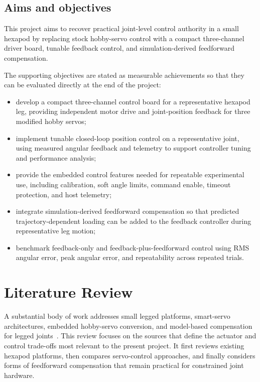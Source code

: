 \subsection{Aims and objectives}
This project aims to recover practical joint-level control authority in a small hexapod by replacing stock hobby-servo control with a compact three-channel driver board, tunable feedback control, and simulation-derived feedforward compensation.

The supporting objectives are stated as measurable achievements so that they can be evaluated directly at the end of the project:
\begin{itemize}[leftmargin=*]
  \item develop a compact three-channel control board for a representative hexapod leg, providing independent motor drive and joint-position feedback for three modified hobby servos;
  \item implement tunable closed-loop position control on a representative joint, using measured angular feedback and telemetry to support controller tuning and performance analysis;
  \item provide the embedded control features needed for repeatable experimental use, including calibration, soft angle limits, command enable, timeout protection, and host telemetry;
  \item integrate simulation-derived feedforward compensation so that predicted trajectory-dependent loading can be added to the feedback controller during representative leg motion;
  \item benchmark feedback-only and feedback-plus-feedforward control using RMS angular error, peak angular error, and repeatability across repeated trials.
\end{itemize}

\section{Literature Review}

A substantial body of work addresses small legged platforms, smart-servo architectures, embedded hobby-servo conversion, and model-based compensation for legged joints~\cite{saranli2001rhex,barragan2018minirhex,interbotixphantomx,steindl2020bruce,openservo2018,dtuinspectionrobot,backstrom2020servoarm,lynch2017modernrobotics}. This review focuses on the sources that define the actuator and control trade-offs most relevant to the present project. It first reviews existing hexapod platforms, then compares servo-control approaches, and finally considers forms of feedforward compensation that remain practical for constrained joint hardware.

